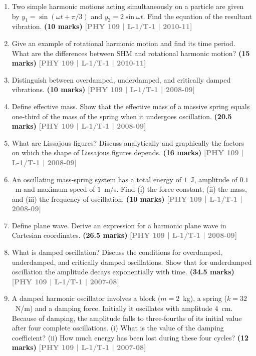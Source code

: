 \documentclass[12pt,a3paper]{article}
\newcommand{\yr}[1]{\hfill\textcolor{gray}{\small\textbf{[#1]}}}
\newcommand{\mk}[1]{\textcolor{orange!70!black}{\small\textbf{(#1 marks)}}}
\begin{document}
\begin{enumerate}
\item Two simple harmonic motions acting simultaneously on a particle are given by $y_1 = \sin(\omega t + \pi/3)$ and $y_2 = 2\sin\omega t$. Find the equation of the resultant vibration.
\mk{10} \yr{PHY 109 | L-1/T-1 | 2010-11}

\item Give an example of rotational harmonic motion and find its time period. What are the differences between SHM and rotational harmonic motion?
\mk{15} \yr{PHY 109 | L-1/T-1 | 2010-11}

\item Distinguish between overdamped, underdamped, and critically damped vibrations.
\mk{10} \yr{PHY 109 | L-1/T-1 | 2008-09}

\item Define effective mass. Show that the effective mass of a massive spring equals one-third of the mass of the spring when it undergoes oscillation.
\mk{20.5} \yr{PHY 109 | L-1/T-1 | 2008-09}

\item What are Lissajous figures? Discuss analytically and graphically the factors on which the shape of Lissajous figures depends.
\mk{16} \yr{PHY 109 | L-1/T-1 | 2008-09}

\item An oscillating mass-spring system has a total energy of $1$~J, amplitude of $0.1$~m and maximum speed of $1$~m/s. Find (i) the force constant, (ii) the mass, and (iii) the frequency of oscillation.
\mk{10} \yr{PHY 109 | L-1/T-1 | 2008-09}

\item Define plane wave. Derive an expression for a harmonic plane wave in Cartesian coordinates.
\mk{26.5} \yr{PHY 109 | L-1/T-1 | 2008-09}

\item What is damped oscillation? Discuss the conditions for overdamped, underdamped, and critically damped oscillations. Show that for underdamped oscillation the amplitude decays exponentially with time.
\mk{34.5} \yr{PHY 109 | L-1/T-1 | 2007-08}

\item A damped harmonic oscillator involves a block ($m = 2$~kg), a spring ($k = 32$~N/m) and a damping force. Initially it oscillates with amplitude $4$~cm. Because of damping, the amplitude falls to three-fourths of its initial value after four complete oscillations. (i) What is the value of the damping coefficient? (ii) How much energy has been lost during these four cycles?
\mk{12} \yr{PHY 109 | L-1/T-1 | 2007-08}


\end{enumerate}
\end{document}
